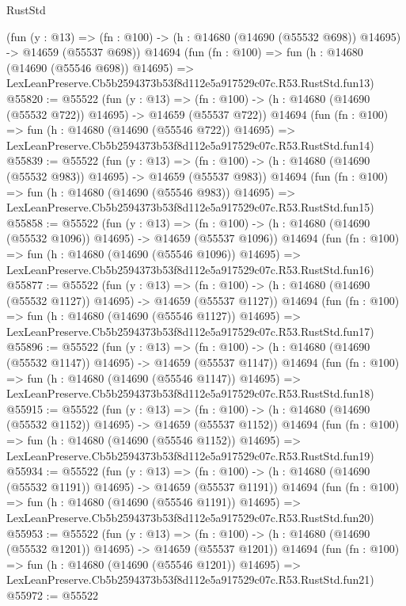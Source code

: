 \begin{lexlean}{RustStd}
\begin{coremodule}
    (fun (y : @13) =>
    (fn : @100) -> (h : @14680 (@14690 (@55532 @698)) @14695) -> @14659 (@55537 @698))
    @14694
    (fun (fn : @100) =>
    fun (h : @14680 (@14690 (@55546 @698)) @14695) =>
    LexLeanPreserve.Cb5b2594373b53f8d112e5a917529c07c.R53.RustStd.fun13)
@55820 := @55522
    (fun (y : @13) =>
    (fn : @100) -> (h : @14680 (@14690 (@55532 @722)) @14695) -> @14659 (@55537 @722))
    @14694
    (fun (fn : @100) =>
    fun (h : @14680 (@14690 (@55546 @722)) @14695) =>
    LexLeanPreserve.Cb5b2594373b53f8d112e5a917529c07c.R53.RustStd.fun14)
@55839 := @55522
    (fun (y : @13) =>
    (fn : @100) -> (h : @14680 (@14690 (@55532 @983)) @14695) -> @14659 (@55537 @983))
    @14694
    (fun (fn : @100) =>
    fun (h : @14680 (@14690 (@55546 @983)) @14695) =>
    LexLeanPreserve.Cb5b2594373b53f8d112e5a917529c07c.R53.RustStd.fun15)
@55858 := @55522
    (fun (y : @13) =>
    (fn : @100) -> (h : @14680 (@14690 (@55532 @1096)) @14695) -> @14659 (@55537 @1096))
    @14694
    (fun (fn : @100) =>
    fun (h : @14680 (@14690 (@55546 @1096)) @14695) =>
    LexLeanPreserve.Cb5b2594373b53f8d112e5a917529c07c.R53.RustStd.fun16)
@55877 := @55522
    (fun (y : @13) =>
    (fn : @100) -> (h : @14680 (@14690 (@55532 @1127)) @14695) -> @14659 (@55537 @1127))
    @14694
    (fun (fn : @100) =>
    fun (h : @14680 (@14690 (@55546 @1127)) @14695) =>
    LexLeanPreserve.Cb5b2594373b53f8d112e5a917529c07c.R53.RustStd.fun17)
@55896 := @55522
    (fun (y : @13) =>
    (fn : @100) -> (h : @14680 (@14690 (@55532 @1147)) @14695) -> @14659 (@55537 @1147))
    @14694
    (fun (fn : @100) =>
    fun (h : @14680 (@14690 (@55546 @1147)) @14695) =>
    LexLeanPreserve.Cb5b2594373b53f8d112e5a917529c07c.R53.RustStd.fun18)
@55915 := @55522
    (fun (y : @13) =>
    (fn : @100) -> (h : @14680 (@14690 (@55532 @1152)) @14695) -> @14659 (@55537 @1152))
    @14694
    (fun (fn : @100) =>
    fun (h : @14680 (@14690 (@55546 @1152)) @14695) =>
    LexLeanPreserve.Cb5b2594373b53f8d112e5a917529c07c.R53.RustStd.fun19)
@55934 := @55522
    (fun (y : @13) =>
    (fn : @100) -> (h : @14680 (@14690 (@55532 @1191)) @14695) -> @14659 (@55537 @1191))
    @14694
    (fun (fn : @100) =>
    fun (h : @14680 (@14690 (@55546 @1191)) @14695) =>
    LexLeanPreserve.Cb5b2594373b53f8d112e5a917529c07c.R53.RustStd.fun20)
@55953 := @55522
    (fun (y : @13) =>
    (fn : @100) -> (h : @14680 (@14690 (@55532 @1201)) @14695) -> @14659 (@55537 @1201))
    @14694
    (fun (fn : @100) =>
    fun (h : @14680 (@14690 (@55546 @1201)) @14695) =>
    LexLeanPreserve.Cb5b2594373b53f8d112e5a917529c07c.R53.RustStd.fun21)
@55972 := @55522

\end{coremodule}
\end{lexlean}
